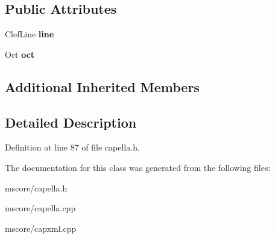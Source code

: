 \subsection*{Public Attributes}
\begin{DoxyCompactItemize}
\item 
\mbox{\label{class_ms_1_1_cap_clef_a74cc4be1d6150d1c5bb45c286e450742}} 
Clef\+Line {\bfseries line}
\item 
\mbox{\label{class_ms_1_1_cap_clef_aafd901368f8dfcb400e8120fc7d744fb}} 
Oct {\bfseries oct}
\end{DoxyCompactItemize}
\subsection*{Additional Inherited Members}


\subsection{Detailed Description}


Definition at line 87 of file capella.\+h.



The documentation for this class was generated from the following files\+:\begin{DoxyCompactItemize}
\item 
mscore/capella.\+h\item 
mscore/capella.\+cpp\item 
mscore/capxml.\+cpp\end{DoxyCompactItemize}
